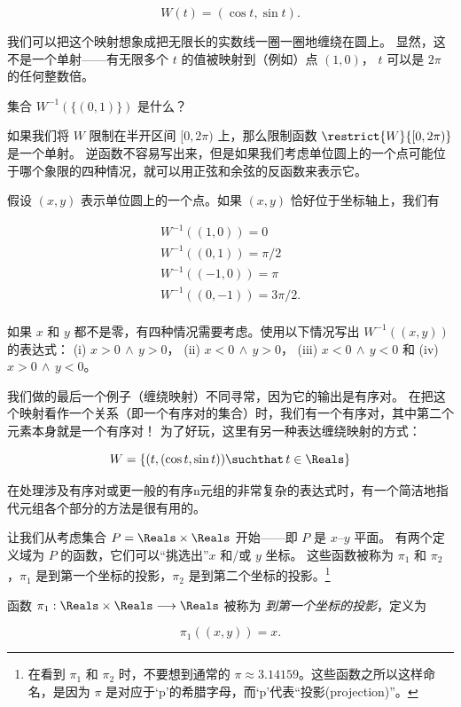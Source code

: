 \[ W(t) = (\cos{t}, \sin{t}). \]

我们可以把这个映射想象成把无限长的实数线一圈一圈地缠绕在圆上。
显然，这不是一个单射——有无限多个 $t$ 的值被映射到（例如）点 $(1,0)$， $t$ 可以是 $2\pi$ 的任何整数倍。

\begin{exer}
集合 $W^{-1}(\{(0,1)\})$ 是什么？
\end{exer}

如果我们将 $W$ 限制在半开区间 $[0, 2\pi)$ 上，那么限制函数 $\restrict{W}{[0, 2\pi)}$ 是一个单射。
逆函数不容易写出来，但是如果我们考虑单位圆上的一个点可能位于哪个象限的四种情况，就可以用正弦和余弦的反函数来表示它。

\begin{exer}
假设 $(x,y)$ 表示单位圆上的一个点。如果 $(x,y)$ 恰好位于坐标轴上，我们有

\begin{gather*}
W^{-1}((1,0)) = 0\\
W^{-1}((0,1)) = \pi/2\\
W^{-1}((-1,0)) = \pi\\
W^{-1}((0,-1)) = 3\pi/2.\\
\end{gather*}

如果 $x$ 和 $y$ 都不是零，有四种情况需要考虑。使用以下情况写出 $W^{-1}((x,y))$ 的表达式：
(i) $x>0 \, \land \, y>0$， 
(ii) $x<0 \, \land \, y>0$， 
(iii) $x<0 \, \land \, y<0$ 和  
(iv) $x>0 \, \land \, y<0$。
\end{exer}

我们做的最后一个例子（缠绕映射）不同寻常，因为它的输出是有序对。
在把这个映射看作一个关系（即一个有序对的集合）时，我们有一个有序对，其中第二个元素本身就是一个有序对！
为了好玩，这里有另一种表达缠绕映射的方式：

\[ W = \{ (t, (\cos{t}, \sin{t})) \suchthat \, t \in \Reals \} \]

在处理涉及有序对或更一般的有序n元组的非常复杂的表达式时，有一个简洁地指代元组各个部分的方法是很有用的。

让我们从考虑集合 $P = \Reals \times \Reals$ 开始——即 $P$ 是 $x$--$y$ 平面。
有两个定义域为 $P$ 的函数，它们可以“挑选出”$x$ 和/或 $y$ 坐标。
这些函数被称为 $\pi_1$ 和 $\pi_2$，$\pi_1$ 是到第一个坐标的投影，$\pi_2$ 是到第二个坐标的投影。\footnote{在看到 $\pi_1$ 和 $\pi_2$ 时，不要想到通常的 $\pi \approx 3.14159$。这些函数之所以这样命名，是因为 $\pi$ 是对应于‘p’的希腊字母，而‘p’代表“投影(projection)”。}

\begin{defi}
函数 $\pi_1: \Reals \times \Reals \longrightarrow \Reals$ 被称为 \emph{到第一个坐标的投影}，定义为

\[ \pi_1((x,y)) = x. \]

\end{defi}

